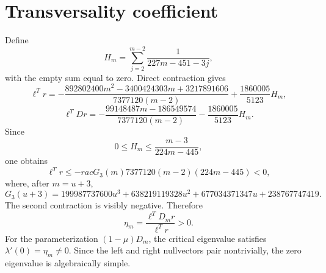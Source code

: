 \section*{Transversality coefficient}
Define
\[
H_m=\sum_{j=2}^{m-2}\frac1{227m-451-3j},
\]
with the empty sum equal to zero.  Direct contraction gives
\[
\ell^Tr=-\frac{892802400m^2-3400424303m+3217891606}
{7377120(m-2)}+\frac{1860005}{5123}H_m,
\]
\[
\ell^TD r=-\frac{99148487m-186549574}{7377120(m-2)}
-\frac{1860005}{5123}H_m.
\]
Since
\[
0\le H_m\le\frac{m-3}{224m-445},
\]
one obtains
\[
\ell^Tr\le-rac{G_3(m)}{7377120(m-2)(224m-445)}<0,
\]
where, after $m=u+3$,
\[
G_3(u+3)=199987737600u^3+638219119328u^2
+677034371347u+238767747419.
\]
The second contraction is visibly negative.  Therefore
\[
\eta_m=\frac{\ell^TD_mr}{\ell^Tr}>0.
\]
For the parameterization $(1-\mu)D_m$, the critical eigenvalue satisfies
$\lambda'(0)=\eta_m\neq0$.  Since the left and right nullvectors pair
nontrivially, the zero eigenvalue is algebraically simple.
